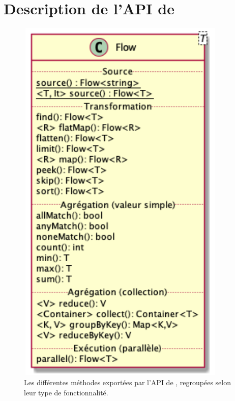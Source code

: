 
\chapter{Description de l'API de \PpFf}
\label{description.chap}





\begin{figure}
\centering
     \includegraphics[height=18cm, width=10cm]{Figures/flow-details.png}
      \caption{Les diff\'erentes m\'ethodes export\'ees par l'{API} de \ppff,
     regroup\'ees selon leur type de fonctionnalit\'e.}
       \label{MethodesAPI.fig}
\end{figure}


